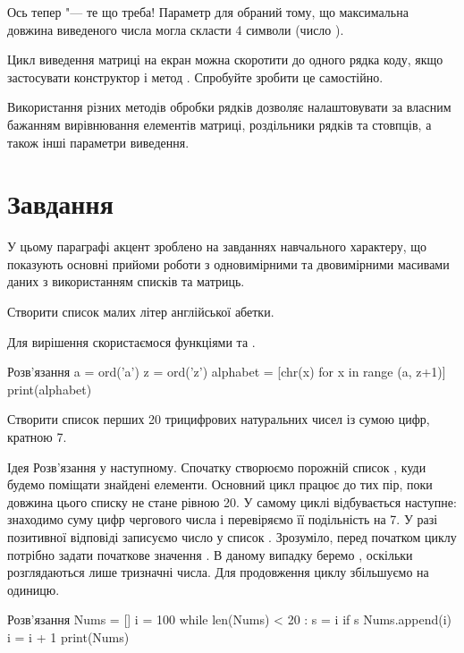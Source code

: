 Ось тепер "--- те що треба! Параметр  для  обраний тому, що максимальна довжина виведеного числа могла скласти 4 символи (число ).

Цикл виведення матриці на екран можна скоротити до одного рядка коду, якщо застосувати конструктор і метод . Спробуйте зробити це самостійно.

Використання різних методів обробки рядків дозволяє налаштовувати за власним бажанням вирівнювання елементів матриці, роздільники рядків та стовпців, а також інші параметри виведення.

\section{Завдання}

У цьому параграфі акцент зроблено на завданнях навчального характеру, що показують основні прийоми роботи з одновимірними та двовимірними масивами даних з використанням списків та матриць.

\begin{pr}{}
Створити список малих літер англійської абетки.
\end{pr}

Для вирішення скористаємося функціями  та .

\begin{py}{Розв'язання}
a = ord('a')
z = ord('z')
alphabet = [chr(x) for x in range (a, z+1)]
print(alphabet)
\end{py}

\begin{pr}{}
Створити список перших 20 трицифрових натуральних чисел із сумою цифр, кратною 7.
\end{pr}

Ідея Розв'язання у наступному. Спочатку створюємо порожній список , куди будемо поміщати знайдені елементи. Основний цикл працює до тих пір, поки довжина цього списку не стане рівною 20. У самому циклі відбувається наступне: знаходимо суму цифр чергового числа  і перевіряємо її подільність на 7. У разі позитивної відповіді записуємо число  у список . Зрозуміло, перед початком циклу потрібно задати початкове значення . В даному випадку беремо , оскільки розглядаються лише тризначні числа. Для продовження циклу  збільшуємо на одиницю.

\begin{py}{Розв'язання}
Nums = []
i = 100
while len(Nums) < 20 :
    s = i %
    if s %
        Nums.append(i)
    i = i + 1
print(Nums)
\end{py}

